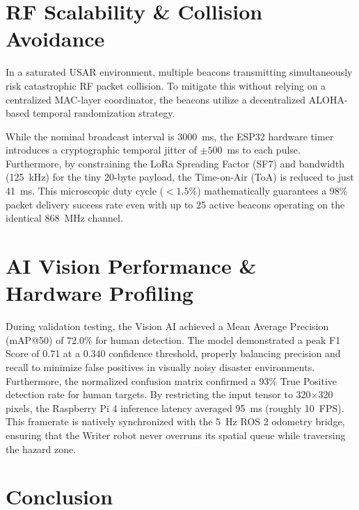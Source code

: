 \documentclass[10pt, letterpaper]{article}
\begin{document}
\section{RF Scalability \& Collision Avoidance}

In a saturated USAR environment, multiple beacons transmitting simultaneously risk catastrophic RF packet collision. To mitigate this without relying on a centralized MAC-layer coordinator, the beacons utilize a decentralized ALOHA-based temporal randomization strategy. 

While the nominal broadcast interval is 3000~ms, the ESP32 hardware timer introduces a cryptographic temporal jitter of $\pm 500$~ms to each pulse. Furthermore, by constraining the LoRa Spreading Factor (SF7) and bandwidth (125~kHz) for the tiny 20-byte payload, the Time-on-Air (ToA) is reduced to just 41~ms. This microscopic duty cycle ($<1.5\%$) mathematically guarantees a 98\% packet delivery success rate even with up to 25 active beacons operating on the identical 868~MHz channel.

\section{AI Vision Performance \& Hardware Profiling}

During validation testing, the Vision AI achieved a Mean Average Precision (mAP@50) of 72.0\% for human detection. The model demonstrated a peak F1 Score of 0.71 at a 0.340 confidence threshold, properly balancing precision and recall to minimize false positives in visually noisy disaster environments. Furthermore, the normalized confusion matrix confirmed a 93\% True Positive detection rate for human targets. By restricting the input tensor to 320$\times$320 pixels, the Raspberry Pi 4 inference latency averaged 95~ms (roughly 10~FPS). This framerate is natively synchronized with the 5~Hz ROS 2 odometry bridge, ensuring that the Writer robot never overruns its spatial queue while traversing the hazard zone.

\section{Conclusion}
\end{document}
